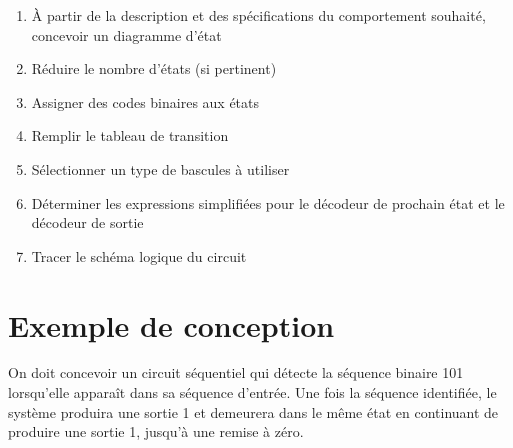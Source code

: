 \documentclass[letter, oneside]{book}
\begin{document}
\begin{enumerate}
\item À partir de la description et des spécifications du comportement
souhaité, concevoir un diagramme d'état
\item Réduire le nombre d'états (si pertinent)
\item Assigner des codes binaires aux états
\item Remplir le tableau de transition
\item Sélectionner un type de bascules à utiliser
\item Déterminer les expressions simplifiées pour le décodeur de prochain
état et le décodeur de sortie
\item Tracer le schéma logique du circuit
\end{enumerate}

\section{Exemple de conception}
\label{sec:org0d19ab1}

On doit concevoir un circuit séquentiel qui détecte la séquence
binaire 101 lorsqu'elle apparaît dans sa séquence d'entrée. Une fois
la séquence identifiée, le système produira une sortie 1 et demeurera
dans le même état en continuant de produire une sortie 1, jusqu'à une
remise à zéro.
\end{document}
